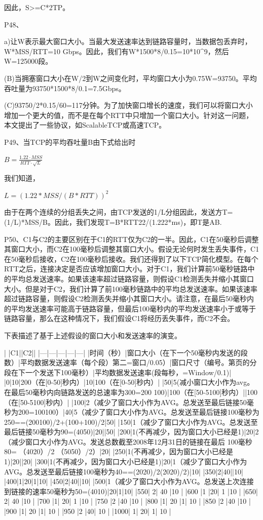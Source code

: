 \documentclass[11pt,UTF8,twoside]{article}
\begin{document}
	因此，S>=C*2TP。
	
	P48、
	
	a)让W表示最大窗口大小。当最大发送速率达到链路容量时，当数据包丢弃时，W*MSS/RTT=10 Gbps。因此，我们有W*1500*8/0.15=10*10^9，然后W=125000段。
	
	(B)当拥塞窗口大小在W/2到W之间变化时，平均窗口大小为0.75W=93750。平均吞吐量为93750*1500*8/0.1=7.5Gbps。
	
	(C)93750/2*0.15/60=117分钟。为了加快窗口增长的速度，我们可以将窗口大小增加一个更大的值，而不是在每个RTT中只增加一个窗口大小。针对这一问题，本文提出了一些协议，如ScalableTCP或高速TCP。
	
	P49、当TCP的平均吞吐量B由下式给出时
	
	$B=\frac{1.22 \cdot MSS}{RTT \cdot \sqrt{L}}$
	
	我们知道，
	
	$L=(1.22\ast MSS/(B\ast RTT))^2$
	
	由于在两个连续的分组丢失之间，由TCP发送的1/L分组因此，发送方T=(1/L)*MSS/B。因此，我们发现T=B*RTT22/(1.222*ms)，即T是AB.
	
	P50、C1与C2的主要区别在于C1的RTT仅为C2的一半。因此，C1在50毫秒后调整其窗口大小，而C2在100毫秒后调整其窗口大小。假设无论何时发生丢失事件，C1在50毫秒后接收，C2在100毫秒后接收。我们还得到了以下TCP简化模型。在每个RTT之后，连接决定是否应该增加窗口大小。对于C1，我们计算前50毫秒链路中的平均总发送速率。如果该速率超过链路容量，则假设C1检测丢失并缩小其窗口大小。但是对于C2，我们计算了前100毫秒链路中的平均总发送速率。如果该速率超过链路容量，则假设C2检测丢失并缩小其窗口大小。请注意，在最后50毫秒内的平均发送速率可能高于链路容量，但最后100毫秒内的平均发送速率小于或等于链路容量，那么在这种情况下，我们假设C1将经历丢失事件，而C2不会。
	
	下表描述了基于上述假设的窗口大小和发送速率的演变。
	
	|   |C1||C2||
	|---|---|---|---|---|
	|时间（秒）|窗口大小（在下一个50毫秒内发送的段数）|平均数据发送速率（每个段）第二=窗口/0.05）|窗口尺寸（编号。第页的分段在下一个发送下100毫秒）|平均数据发送速率(段每秒，=Window/0.1)|
	|0|10|200（在[0-50]秒内）|10|100（在[0-50]秒内）|
	|50|5(减小窗口大小作为avg。在最后50毫秒内向链路发送的总速率为300=200 100)|100（在[50-5100]秒内）||100（在[50-5100]秒内）|
	|100|2（减少了窗口大小作为AVG。总发送至最后链接50毫秒为200=100100）|40|5（减少了窗口大小作为AVG。总发送至最后链接100毫秒为250==(200100)/2+(100+100)/2|50|
	|150|1（减少了窗口大小作为AVG。总发送至最后链接50毫秒为90=(4050)|20||50|
	|200|1(不再减少，因为窗口大小已经是1)|20|2 （减少窗口大小作为AVG。发送总数截至2008年12月31日的链接在最后 100毫秒 80= （4020）/2 （5050）/2）|20|
	|250|1(不再减少，因为窗口大小已经是1)|20||20|
	|300|1(不再减少，因为窗口大小已经是1)|20|1（减少了窗口大小作为AVG。总发送至最后链接100毫秒为40==(2020)/2(2020)/2)|10|
	|350|2|40||10|
	|400|1|20|1|10|
	|450|2|40||10|
	|500|1（减少了窗口大小作为AVG。总发送上次连接到链接的速率50毫秒为50=(4010)|20|1|10|
	|550| 2| 40 |10 |
	|600 |1 |20| 1 |10 |
	|650| 2| 40 |10 |
	|700 |1| 20| 1 |10 |
	|750 |2 |40 |10 |
	|800 |1| 20 |1| 10 |
	|850 |2 |40 |10 |
	|900 |1| 20 |1| 10 |
	|950 |2 |40| 10 |
	|1000| 1| 20| 1| 10 |
	
\end{document}
